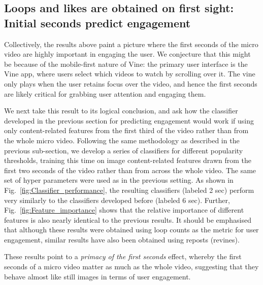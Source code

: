\subsection{Loops and likes are obtained on first sight: Initial seconds predict engagement}
\label{sec:first-seconds}
Collectively, the results above paint a picture where the first seconds of the micro video are highly important in engaging the user. We conjecture that this might be because of the mobile-first nature of Vine: the primary user interface is the Vine app, where users select which videos to watch by scrolling over it. The vine only plays when the user retains focus over the video, and hence the first seconds are likely critical for grabbing user attention and engaging them. 

We next take this result to its logical conclusion, and ask how the classifier developed in the previous section for predicting engagement would work if using only content-related features from the first third of the video rather than from the whole micro video. Following the same methodology as described in the previous sub-section, we develop a series of classifiers for different popularity thresholds, training this time on image content-related features drawn from the first two seconds of the video rather than from across the whole video. The same set of hyper parameters were used as in the previous setting. As shown in Fig.~\ref{fig:Classifier_performance}, the resulting classifiers (labeled 2 sec) perform very similarly to the classifiers developed before (labeled 6 sec). Further, Fig.~\ref{fig:Feature_importance} shows that the relative importance of different features is also nearly identical to the previous results. It should be emphasised that although these results were obtained using loop counts as the metric for user engagement, similar results have also been obtained using reposts (revines). 

These results point to a \emph{primacy of the first seconds} effect, whereby the first seconds of a micro video matter as much as the whole video, suggesting that they behave almost like still images in terms of user engagement.







